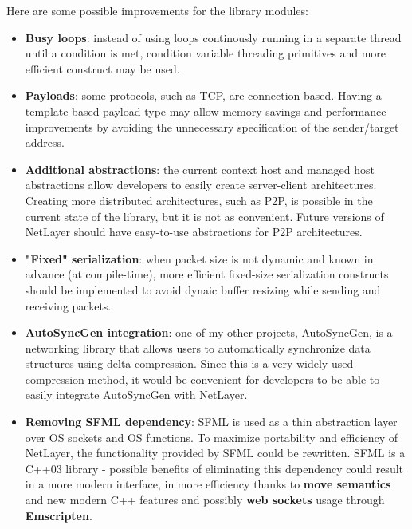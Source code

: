 \documentclass[11pt]{report}
\newcommand{\+}{\discretionary{\mbox{\scriptsize$\hookleftarrow$}}{}{}}
\renewcommand\emph{\textbf}
\begin{document}
        Here are some possible improvements for the library modules:

        \begin{itemize}
            \item \emph{Busy loops}: instead of using loops continously running in a separate thread until a condition is met, condition variable threading primitives and more efficient construct may be used.
            
            \item \emph{Payloads}: some protocols, such as TCP, are connection-based. Having a template-based payload type may allow memory savings and performance improvements by avoiding the unnecessary specification of the sender/target address.
            
            \item \emph{Additional abstractions}: the current context host and managed host abstractions allow developers to easily create server-client architectures. Creating more distributed architectures, such as P2P, is possible in the current state of the library, but it is not as convenient. Future versions of NetLayer should have easy-to-use abstractions for P2P architectures.
            
            \item \emph{"Fixed" serialization}: when packet size is not dynamic and known in advance (at compile-time), more efficient fixed-size serialization constructs should be implemented to avoid dynaic buffer resizing while sending and receiving packets.

            \item \emph{AutoSyncGen integration}: one of my other projects, AutoSyncGen, is a networking library that allows users to automatically synchronize data structures using delta compression. Since this is a very widely used compression method, it would be convenient for developers to be able to easily integrate AutoSyncGen with NetLayer.

            \item \emph{Removing SFML dependency}: SFML is used as a thin abstraction layer over OS sockets and OS functions. To maximize portability and efficiency of NetLayer, the functionality provided by SFML could be rewritten. SFML is a C++03 library - possible benefits of eliminating this dependency could result in a more modern interface, in more efficiency thanks to \emph{move semantics} and new modern C++ features and possibly \emph{web sockets} usage through \emph{Emscripten}.


\end{itemize}
\end{document}
